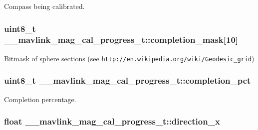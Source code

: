 Compass being calibrated. 

\hypertarget{struct____mavlink__mag__cal__progress__t_a943429de851771dff29cb6b0f2ced1df}{
\subsubsection[{completion\+\_\+mask}]{\setlength{\rightskip}{0pt plus 5cm}uint8\+\_\+t \+\_\+\+\_\+mavlink\+\_\+mag\+\_\+cal\+\_\+progress\+\_\+t\+::completion\+\_\+mask\mbox{[}10\mbox{]}}}\label{struct____mavlink__mag__cal__progress__t_a943429de851771dff29cb6b0f2ced1df}


Bitmask of sphere sections (see \href{http://en.wikipedia.org/wiki/Geodesic_grid}{\tt http\+://en.\+wikipedia.\+org/wiki/\+Geodesic\+\_\+grid}) 

\hypertarget{struct____mavlink__mag__cal__progress__t_a9b0f5a88d925b9e667e4714770c119ed}{
\subsubsection[{completion\+\_\+pct}]{\setlength{\rightskip}{0pt plus 5cm}uint8\+\_\+t \+\_\+\+\_\+mavlink\+\_\+mag\+\_\+cal\+\_\+progress\+\_\+t\+::completion\+\_\+pct}}\label{struct____mavlink__mag__cal__progress__t_a9b0f5a88d925b9e667e4714770c119ed}


Completion percentage. 

\hypertarget{struct____mavlink__mag__cal__progress__t_a2f3d8129e9448ada15293a4487c8a6f4}{
\subsubsection[{direction\+\_\+x}]{\setlength{\rightskip}{0pt plus 5cm}float \+\_\+\+\_\+mavlink\+\_\+mag\+\_\+cal\+\_\+progress\+\_\+t\+::direction\+\_\+x}}\label{struct____mavlink__mag__cal__progress__t_a2f3d8129e9448ada15293a4487c8a6f4}


